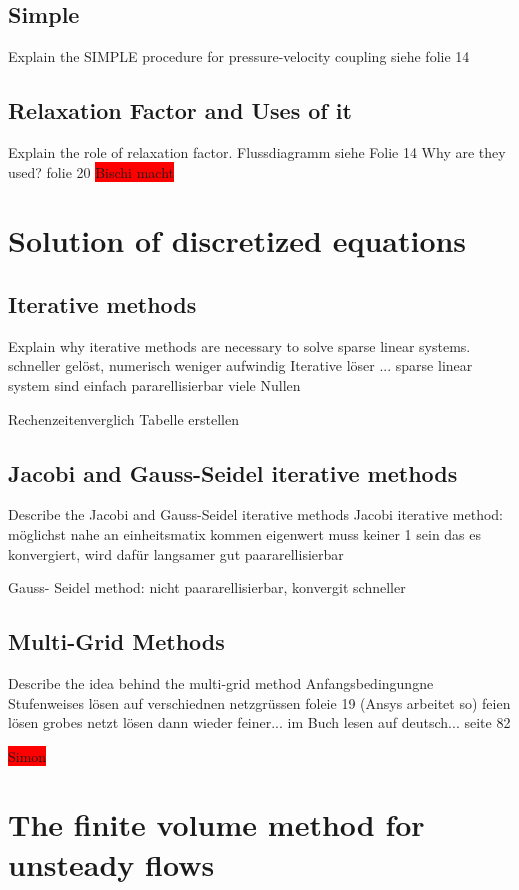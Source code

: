 \documentclass[a4paper]{scrartcl}
\begin{document}
\subsection{Simple} Explain the SIMPLE procedure for pressure-velocity coupling
siehe folie 14

\subsection{Relaxation Factor and Uses of it}
Explain the role of relaxation factor. 
Flussdiagramm siehe Folie 14
 Why are they used?
folie 20
\colorbox{red}{Bischi macht}


\section{Solution of discretized equations}


\subsection{Iterative methods} 
Explain why iterative methods are necessary to
solve sparse linear systems.
schneller gelöst, numerisch weniger aufwindig
Iterative löser ...
sparse linear system sind einfach pararellisierbar viele Nullen

Rechenzeitenverglich Tabelle erstellen

\subsection{Jacobi and Gauss-Seidel iterative methods}
Describe the Jacobi and Gauss-Seidel iterative methods
Jacobi iterative method: 
möglichst nahe an einheitsmatix kommen
eigenwert muss keiner 1 sein das es konvergiert, wird dafür langsamer 
gut paararellisierbar

Gauss- Seidel method: 
nicht paararellisierbar, konvergit schneller

\subsection{Multi-Grid Methods} 
Describe the idea behind the multi-grid method
Anfangsbedingungne 
Stufenweises lösen auf verschiednen netzgrüssen
foleie 19 (Ansys arbeitet so)
feien lösen
grobes netzt lösen
dann wieder feiner...
im Buch lesen auf deutsch... seite 82

\colorbox{red}{Simon}

\section{The finite volume method for unsteady flows}
\end{document}
